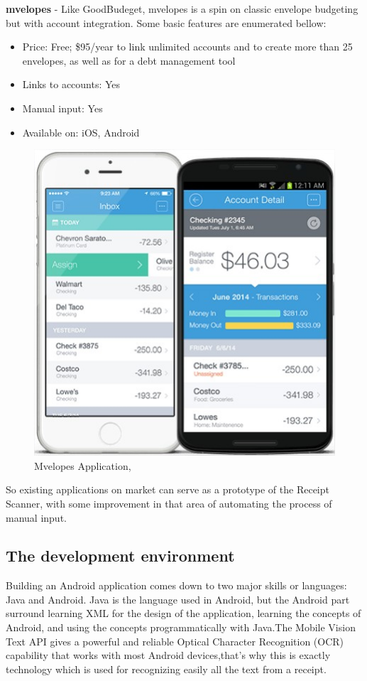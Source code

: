 \textbf{mvelopes} -  Like GoodBudeget, mvelopes is a spin on classic envelope budgeting but with account integration. Some basic features are enumerated bellow: 
\begin{itemize}
	\item Price: Free; \$95/year to link unlimited accounts and to create more than 25 envelopes, as well as for a debt management tool
	\item Links to accounts: Yes
	\item Manual input: Yes
	\item Available on: iOS, Android
\end{itemize}
\begin{figure}[H]
	\centering
	\includegraphics[width=12cm]{Chapter1/Mvelopes.jpg}
	\caption{Mvelopes Application, \cite{Mvelopes}}
	\label{fig:Goodbudget}
\end{figure}
So existing applications on market can serve as a prototype of the Receipt Scanner, with some improvement in that area of automating the process of manual input.

\subsection{The development environment}
Building an Android application comes down to two major skills or languages: Java and Android. Java is the language used in Android, but the Android part surround learning XML for the design of the application, learning the concepts of Android, and using the concepts programmatically with Java.The Mobile Vision Text API gives a powerful and reliable Optical Character Recognition (OCR) capability that works with most Android devices,that's why this is exactly technology which is used for recognizing easily all the text from a receipt.

